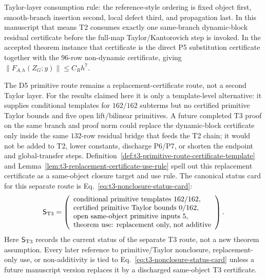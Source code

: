 \documentclass[preprint,12pt]{elsarticle}
\begin{document}
Taylor-layer consumption rule: the reference-style ordering is fixed object
first, smooth-branch insertion second, local defect third, and propagation
last.  In this manuscript that means T2 consumes exactly one same-branch
dynamic-block residual certificate before the full-map Taylor/Kantorovich step
is invoked.  In the accepted theorem instance that certificate is the direct
P5 substitution certificate together with the 96-row non-dynamic certificate,
giving \(\|F_{A,h}(Z_G;y)\|\le C_Rh^7\).

The D5 primitive route remains a replacement-certificate route, not a second
Taylor layer.  For the results claimed here it is only a template-level
alternative: it supplies conditional templates for \(162/162\) subterms but
no certified primitive Taylor bounds and five open lift/bilinear primitives.
A future completed T3 proof on the same branch
and proof norm could replace the dynamic-block certificate only inside the
same \(132\)-row residual bridge that feeds the T2 chain; it would not be
added to T2, lower constants, discharge P6/P7, or shorten the endpoint and
global-transfer steps.  Definition~\ref{def:t3-primitive-route-certificate-template}
and Lemma~\ref{lem:t3-replacement-certificate-use-rule} spell out this
replacement certificate as a same-object closure target and use rule.
The canonical status card for this separate route is Eq.~\eqref{eq:t3-nonclosure-status-card}:
\begin{equation}
\label{eq:t3-nonclosure-status-card}
\mathsf S_{\rm T3}
=
\left(
\begin{array}{l}
\text{conditional primitive templates }162/162,\\
\text{certified primitive Taylor bounds }0/162,\\
\text{open same-object primitive inputs }5,\\
\text{theorem use: replacement only, not additive}
\end{array}
\right).
\end{equation}
Here \(\mathsf S_{\rm T3}\) records the current status of the separate T3
route, not a new theorem assumption.  Every later reference to primitive/Taylor
nonclosure, replacement-only use, or non-additivity is tied to
Eq.~\eqref{eq:t3-nonclosure-status-card} unless a future manuscript version
replaces it by a discharged same-object T3 certificate.
\end{document}

